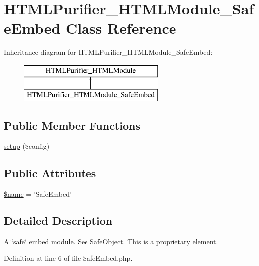 \hypertarget{classHTMLPurifier__HTMLModule__SafeEmbed}{\section{H\+T\+M\+L\+Purifier\+\_\+\+H\+T\+M\+L\+Module\+\_\+\+Safe\+Embed Class Reference}
\label{classHTMLPurifier__HTMLModule__SafeEmbed}
}
Inheritance diagram for H\+T\+M\+L\+Purifier\+\_\+\+H\+T\+M\+L\+Module\+\_\+\+Safe\+Embed\+:\begin{figure}[H]
\begin{center}
\leavevmode
\includegraphics[height=2.000000cm]{classHTMLPurifier__HTMLModule__SafeEmbed}
\end{center}
\end{figure}
\subsection*{Public Member Functions}
\begin{DoxyCompactItemize}
\item 
\hyperlink{classHTMLPurifier__HTMLModule__SafeEmbed_a945a60cc36924526dd7238e996217106}{setup} (\$config)
\end{DoxyCompactItemize}
\subsection*{Public Attributes}
\begin{DoxyCompactItemize}
\item 
\hyperlink{classHTMLPurifier__HTMLModule__SafeEmbed_a00ddb5aadbb7b6c79639e6063c857b45}{\$name} = 'Safe\+Embed'
\end{DoxyCompactItemize}


\subsection{Detailed Description}
A \char`\"{}safe\char`\"{} embed module. See Safe\+Object. This is a proprietary element. 

Definition at line 6 of file Safe\+Embed.\+php.



